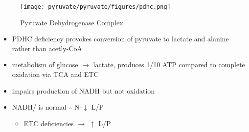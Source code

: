 \documentclass{scrartcl}
\begin{document}
\begin{figure}[htbp]
\centering
\texttt{[image: pyruvate/pyruvate/figures/pdhc.png]}
\caption[pdhc]{\label{fig:orgb6c5338}Pyruvate Dehydrogenase Complex}
\end{figure}

\begin{itemize}
\item PDHC deficiency provokes conversion of pyruvate to lactate and alanine rather than acetly-CoA
\item metabolism of glucose \(\to\) lactate, produces 1/10 ATP compared to
complete oxidation via TCA and ETC
\item impairs production of NADH but not oxidation
\item NADH/ is normal \(\therefore\) N-\(\downarrow\) L/P
\begin{itemize}
\item ETC deficiencies \(\to\) \(\uparrow\) L/P
\end{itemize}
\end{itemize}
\end{document}
